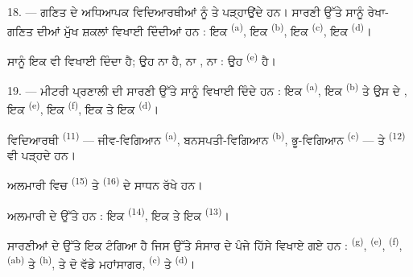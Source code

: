 18. --- ਗਣਿਤ ਦੇ ਅਧਿਆਪਕ ਵਿਦਿਆਰਥੀਆਂ ਨੂੰ  ਤੇ
 ਪੜ੍ਹਾਉਂਦੇ ਹਨ। ਸਾਰਣੀ ਉੱਤੇ ਸਾਨੂੰ ਰੇਖਾ-ਗਣਿਤ ਦੀਆਂ ਮੁੱਖ
ਸ਼ਕਲਾਂ ਵਿਖਾਈ ਦਿੰਦੀਆਂ ਹਨ : ਇਕ  \textsuperscript{(a)}, ਇਕ
 \textsuperscript{(b)}, ਇਕ  \textsuperscript{(c)}, ਇਕ
 \textsuperscript{(d)}।

ਸਾਨੂੰ ਇਕ  ਵੀ ਵਿਖਾਈ ਦਿੰਦਾ ਹੈ; ਉਹ ਨਾ  ਹੈ, ਨਾ
, ਨਾ  : ਉਹ  \textsuperscript{(e)} ਹੈ।

19. --- ਮੀਟਰੀ ਪ੍ਰਣਾਲੀ ਦੀ ਸਾਰਣੀ ਉੱਤੇ ਸਾਨੂੰ ਵਿਖਾਈ ਦਿੰਦੇ ਹਨ : ਇਕ 
\textsuperscript{(a)}, ਇਕ  \textsuperscript{(b)} ਤੇ ਉਸ ਦੇ
, ਇਕ  \textsuperscript{(e)}, ਇਕ 
\textsuperscript{(f)}, ਇਕ  ਤੇ ਇਕ 
\textsuperscript{(d)}।

ਵਿਦਿਆਰਥੀ  \textsuperscript{(11)} --- ਜੀਵ-ਵਿਗਿਆਨ
\textsuperscript{(a)}, ਬਨਸਪਤੀ-ਵਿਗਿਆਨ \textsuperscript{(b)}, ਭੂ-ਵਿਗਿਆਨ
\textsuperscript{(c)} --- ਤੇ  \textsuperscript{(12)} ਵੀ ਪੜ੍ਹਦੇ ਹਨ।

ਅਲਮਾਰੀ ਵਿਚ  \textsuperscript{(15)} ਤੇ 
\textsuperscript{(16)} ਦੇ ਸਾਧਨ ਰੱਖੇ ਹਨ।

ਅਲਮਾਰੀ ਦੇ ਉੱਤੇ ਹਨ : ਇਕ  \textsuperscript{(14)}, ਇਕ  ਤੇ
ਇਕ  \textsuperscript{(13)}।

ਸਾਰਣੀਆਂ ਦੇ ਉੱਤੇ ਇਕ  ਟੰਗਿਆ ਹੈ ਜਿਸ ਉੱਤੇ ਸੰਸਾਰ ਦੇ ਪੰਜੇ ਹਿੱਸੇ ਵਿਖਾਏ
ਗਏ ਹਨ :  \textsuperscript{(g)}, 
\textsuperscript{(e)},  \textsuperscript{(f)}, 
\textsuperscript{(ab)} ਤੇ  \textsuperscript{(h)}, ਤੇ ਦੋ ਵੱਡੇ
ਮਹਾਂਸਾਗਰ,  \textsuperscript{(c)} ਤੇ 
\textsuperscript{(d)}।
\VUsaut{6.0mm}
\VUfilet{22mm}
